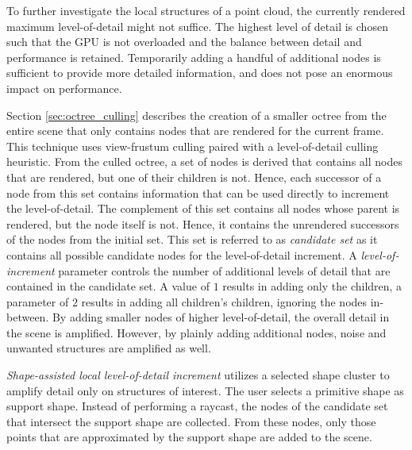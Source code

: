 To further investigate the local structures of a point cloud, the currently rendered maximum level-of-detail might not suffice. The highest level of detail is chosen such that the GPU is not overloaded and the balance between detail and performance is retained. Temporarily adding a handful of additional nodes is sufficient to provide more detailed information, and does not pose an enormous impact on performance. 
    
\par

Section \ref{sec:octree_culling} describes the creation of a smaller octree from the entire scene that only contains nodes that are rendered for the current frame. This technique uses view-frustum culling paired with a level-of-detail culling heuristic. From the culled octree, a set of nodes is derived that contains all nodes that are rendered, but one of their children is not. Hence, each successor of a node from this set contains information that can be used directly to increment the level-of-detail. The complement of this set contains all nodes whose parent is rendered, but the node itself is not. Hence, it contains the unrendered successors of the nodes from the initial set. This set is referred to as \textit{candidate set} as it contains all possible candidate nodes for the level-of-detail increment. A \textit{level-of-increment} parameter controls the number of additional levels of detail that are contained in the candidate set. A value of $1$ results in adding only the children, a parameter of $2$ results in adding all children's children, ignoring the nodes in-between. By adding smaller nodes of higher level-of-detail, the overall detail in the scene is amplified. However, by plainly adding additional nodes, noise and unwanted structures are amplified as well. 

\par
    
\textit{Shape-assisted local level-of-detail increment} utilizes a selected shape cluster to amplify detail only on structures of interest. The user selects a primitive shape as support shape. Instead of performing a raycast, the nodes of the candidate set that intersect the support shape are collected. From these nodes, only those points that are approximated by the support shape are added to the scene. 
    
